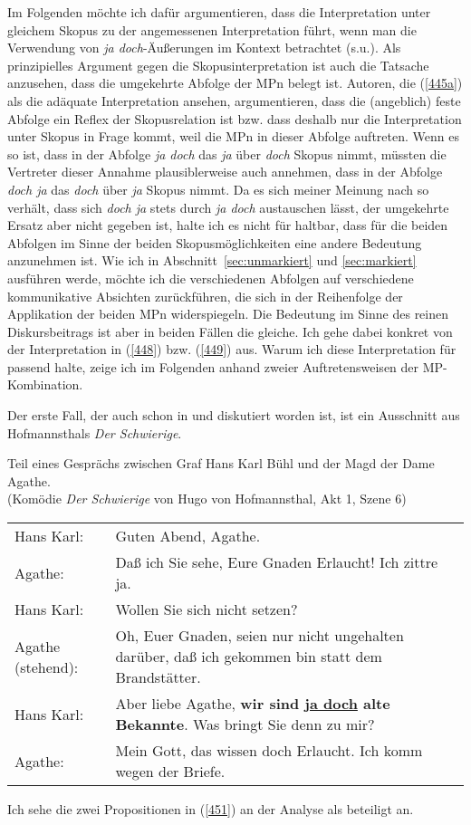 Im Folgenden möchte ich dafür argumentieren, dass die Interpretation unter gleichem Skopus zu der angemessenen Interpretation führt, wenn man die Verwendung von \textit{ja doch}-Äußerungen im Kontext betrachtet (s.u.). Als prinzipielles Argument gegen die Skopusinterpretation ist auch die Tatsache anzusehen, dass die umgekehr\-te Abfolge der MPn belegt ist. Autoren, die (\ref{445a}) als die adäquate Interpretation ansehen, argumentieren, dass die (angeblich) feste Abfolge ein Reflex der Skopusrelation  ist bzw. dass deshalb nur die Interpretation unter Skopus in Frage kommt, weil die MPn in dieser Abfolge auftreten. Wenn es so ist, dass in der Abfolge \textit{ja doch} das \textit{ja} über \textit{doch} Skopus nimmt, müssten die Vertreter dieser Annahme plausiblerweise auch annehmen, dass in der Abfolge \textit{doch ja} das \textit{doch} über \textit{ja} Skopus nimmt. Da es sich meiner Meinung nach so verhält, dass sich \textit{doch ja} stets durch \textit{ja doch} austauschen lässt, der umgekehrte Ersatz aber nicht gegeben ist, halte ich es nicht für haltbar, dass für die beiden Abfolgen im Sinne der beiden Skopusmöglichkeiten eine andere Bedeutung anzunehmen ist. Wie ich in Abschnitt~\ref{sec:unmarkiert} und \ref{sec:markiert} ausführen werde, möchte ich die verschiedenen Abfolgen auf verschiedene kommunikative Absichten zurückführen, die sich in der Reihenfolge der Applikation der beiden MPn widerspiegeln. Die Bedeutung im Sinne des reinen Diskursbeitrags ist aber in beiden Fällen die gleiche. Ich gehe dabei konkret von der Interpretation in (\ref{448}) bzw. (\ref{449}) aus. Warum ich diese Interpretation für passend halte, zeige ich im Folgenden anhand zweier Auftretensweisen der MP-Kombination. 

Der erste Fall, der auch schon in \citet{Lindner1991} und \citet{Rinas2007} diskutiert worden ist, ist ein Ausschnitt aus Hofmannsthals \textit{Der Schwierige}.\largerpage

\begin{exe}

	\ex\label{450} Teil eines Gesprächs zwischen Graf Hans Karl Bühl und der Magd der Dame Agathe.\\
			(Komödie \textit{Der Schwierige} von Hugo von Hofmannsthal, Akt 1, Szene 6)\\
			\begin{tabularx}{\linewidth}[t]{@{}lX@{}} 
 				Hans Karl: & Guten Abend, Agathe. \tabularnewline
				Agathe: & Daß ich Sie sehe, Eure Gnaden Erlaucht! Ich zittre ja. \tabularnewline
				Hans Karl: & Wollen Sie sich nicht setzen? \tabularnewline
				Agathe (stehend): & Oh, Euer Gnaden, seien nur nicht ungehalten darüber, daß ich gekommen bin statt dem Brandstätter. \tabularnewline
				Hans Karl: & Aber liebe Agathe, \textbf{wir sind \underline{ja doch} alte Bekannte}. Was bringt Sie denn zu mir? \tabularnewline
 				Agathe: & Mein Gott, das wissen doch Erlaucht. Ich komm wegen der Briefe.  		
 			\end{tabularx}		
\end{exe}
Ich sehe die zwei Propositionen in (\ref{451}) an der Analyse als beteiligt an.


